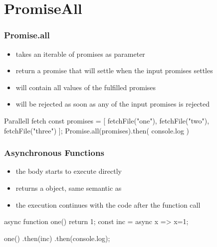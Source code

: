 \section{PromiseAll}
\begin{frame}[fragile] \frametitle{Promise.all}
\begin{itemize}
  \item takes an iterable of promises as parameter 
  \item return a promise that will settle when the input promises settles
  \item will contain all values of the fulfilled promises
  \item will be rejected as soon as any of the input promises is rejected
\end{itemize}
\vspace{5mm}
\begin{CodeBox}{Parallell fetch}
const promises = [
  fetchFile("one"),
  fetchFile("two"),
  fetchFile("three")
];
Promise.all(promises).then(
  console.log
)
\end{CodeBox}
\end{frame}


\begin{frame}[fragile] \frametitle{Asynchronous Functions}
\begin{itemize}
  \item the body starts to execute directly
  \item returns a  object, same semantic as 
  \item the execution continues with the code after the function call
\end{itemize}
\vspace{5mm}
\begin{CodeBox}{}
async function one() {
  return 1;
}
const inc = async x => x=1;

one()
.then(inc)
.then(console.log);
\end{CodeBox}
\end{frame}

